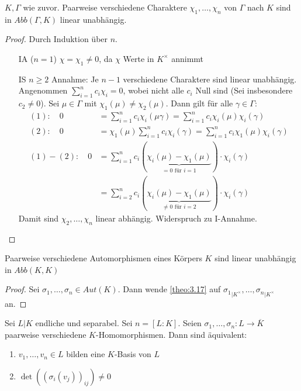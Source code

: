 \documentclass[../main.tex]{subfiles}
\begin{document}
\begin{lemma}\label{theo:3.17}
    $K, \Gamma$ wie zuvor.
    Paarweise verschiedene Charaktere $\chi_1,\dots,\chi_n$ von $\Gamma$ nach $K$ sind in $Abb(\Gamma,K)$ linear unabhängig.
\end{lemma}
\begin{proof}
    Durch Induktion über $n$.
    \begin{itemize}
        \item[IA ($n=1$)] $\chi = \chi_1\neq 0$, da $\chi$ Werte in $K^\times$ annimmt
        \item[IS $n\geq2$] 
        Annahme: Je $n-1$ verschiedene Charaktere sind linear unabhängig.
        Angenommen $\sum_{i=1}^n c_i \chi_i = 0$, wobei nicht alle $c_i$ Null sind (Sei \obda insbesondere $c_2 \neq 0$).
        Sei $\mu\in \Gamma$ mit $\chi_1(\mu) \neq \chi_2(\mu)$.
        Dann gilt für alle $\gamma \in \Gamma$:
        \begin{align*}
            (1):\quad 0 &= \sum_{i=1}^n c_i\chi_i(\mu\gamma) = \sum_{i=1} ^n c_i \chi_i(\mu) \chi_i(\gamma)\\
            (2):\quad 0 &= \chi_1(\mu)\sum_{i=1}^n c_i \chi_i(\gamma) = \sum_{i=1}^n c_i \chi_1(\mu)\chi_i(\gamma)\\
            (1) - (2):\quad 0&= \sum_{i=1}^n c_i (\underbrace{\chi_i(\mu) - \chi_1(\mu)}_{= 0\text{ für }i=1}) \cdot \chi_i(\gamma)\\
            &= \sum_{i=2}^n c_i (\underbrace{\chi_i(\mu) - \chi_1(\mu)}_{\neq 0\text{ für }i=2}) \cdot \chi_i(\gamma)
        \end{align*}
        Damit sind $\chi_2,\dots,\chi_n$ linear abhängig.
        \Lightning Widerspruch zu I-Annahme.
    \end{itemize}
\end{proof}
\begin{corollary} \label{theo:3.18}
    Paarweise verschiedene Automorphismen eines Körpers $K$ sind linear unabhängig in $Abb(K,K)$
\end{corollary}
\begin{proof}
    Sei $\sigma_1,\dots,\sigma_n\in Aut(K)$.
    Dann wende \cref{theo:3.17} auf ${\sigma_1}_{|K^\times},\dots, {\sigma_n}_{|K^\times}$ an.
\end{proof}
\begin{lemma}\label{theo:3.19}
    Sei $L|K$ endliche und separabel. Sei $n= [L:K]$.
    Seien $\sigma_1,\dots,\sigma_n:L\rightarrow \overline{K}$ paarweise verschiedene $K$-Homomorphismen.
    Dann sind äquivalent:
    \begin{enumerate}[label=(\roman*)]
        \item $v_1,\dots,v_n\in L$ bilden eine $K$-Basis von $L$
        \item $\det\left((\sigma_i(v_j))_{ij}\right)\neq 0$
    \end{enumerate}
\end{lemma}
\end{document}
